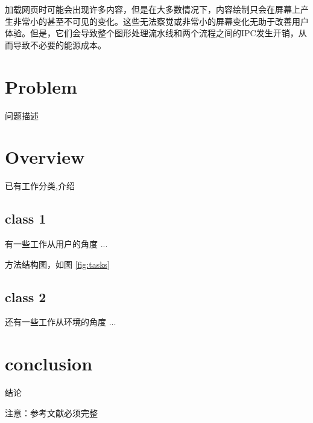 \documentclass[sigconf]{acmart}
\begin{document}
加载网页时可能会出现许多内容，但是在大多数情况下，内容绘制只会在屏幕上产生非常小的甚至不可见的变化。这些无法察觉或非常小的屏幕变化无助于改善用户体验。但是，它们会导致整个图形处理流水线和两个流程之间的IPC发生开销，从而导致不必要的能源成本。


\section{Problem}
问题描述

\section{Overview}
已有工作分类,介绍

\subsection{class 1}
有一些工作从用户的角度 ...



方法结构图，如图 \ref{fig:tasks} 


\subsection{class 2}
还有一些工作从环境的角度 ...

\section{conclusion}
结论

注意：参考文献必须完整



 
\end{document}
